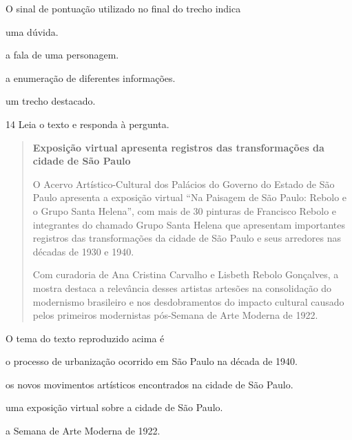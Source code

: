 O sinal de pontuação utilizado no final do trecho indica

\begin{escolha}
  \item uma dúvida.

  \item a fala de uma personagem.

  \item a enumeração de diferentes informações.

  \item um trecho destacado.
\end{escolha}

\num{14} Leia o texto e responda à pergunta.

\begin{quote}
\textbf{Exposição virtual apresenta registros das transformações 
da cidade de São Paulo}

O Acervo Artístico-Cultural dos Palácios do Governo do Estado de São
Paulo apresenta a exposição virtual ``Na Paisagem de São Paulo: Rebolo e
o Grupo Santa Helena'', com mais de 30 pinturas de Francisco Rebolo e
integrantes do chamado Grupo Santa Helena que apresentam importantes
registros das transformações da cidade de São Paulo e seus arredores nas
décadas de 1930 e 1940.

Com curadoria de Ana Cristina Carvalho e Lisbeth Rebolo Gonçalves, a
mostra destaca a relevância desses artistas artesões na consolidação do
modernismo brasileiro e nos desdobramentos do impacto cultural causado
pelos primeiros modernistas pós-Semana de Arte Moderna de 1922.

\end{quote}

O tema do texto reproduzido acima é

\begin{escolha}
  \item o processo de urbanização ocorrido em São Paulo na década de 1940.

  \item os novos movimentos artísticos encontrados na cidade de São Paulo.

  \item uma exposição virtual sobre a cidade de São Paulo.

  \item a Semana de Arte Moderna de 1922.
\end{escolha}

